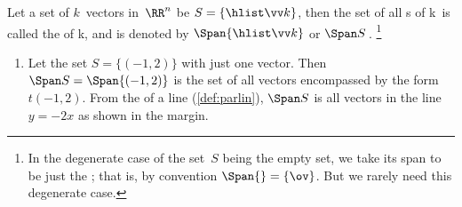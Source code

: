 \begin{definition} \label{def:span} 
Let a set of \(k\)~vectors in~\(\RR^n\) be  \(S=\{\hlist\vv k\}\), then the set of all s of \hlist\vv k\ is called the  of \hlist\vv k, and is denoted by \(\Span\{\hlist\vv k\}\) or \(\Span S\)\,.%
\footnote{In the degenerate case of the set~\(S\) being the empty set, we take its span to be just the ; that is, by convention \(\Span\{\}=\{\ov\}\).  But we rarely need this degenerate case.}
\end{definition}


\begin{example} \label{eg:span}
\begin{enumerate}
\item Let the set \(S=\{(-1,2)\}\) with just one vector.  
%
Then \(\Span S=\Span\{(-1,2)\}\) is the set of all vectors encompassed by the form \(t(-1,2)\).
From the  of a line (\autoref{def:parlin}), \(\Span S\) is all vectors in the line \(y=-2x\) as shown in the margin.


\end{enumerate}
\end{example}
